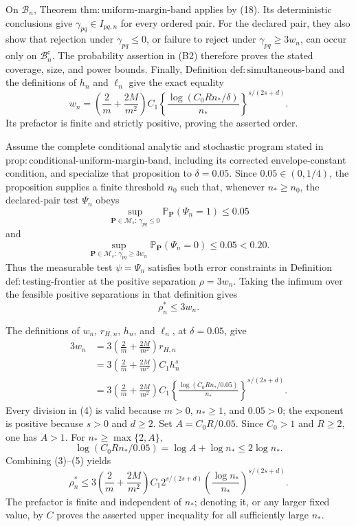 On \(\mathcal B_n\), Theorem \(\mathrm{thm:uniform\text{-}margin\text{-}band}\) applies by (18).  Its deterministic conclusions give \(\gamma_{pq}\in I_{pq,n}\) for every ordered pair.  For the declared pair, they also show that rejection under \(\gamma_{pq}\le0\), or failure to reject under \(\gamma_{pq}\ge3w_n\), can occur only on \(\mathcal B_n^{\mathsf c}\).  The probability assertion in (B2) therefore proves the stated coverage, size, and power bounds.  Finally, Definition \(\mathrm{def:simultaneous\text{-}band}\) and the definitions of \(h_n\) and \(\ell_n\) give the exact equality
\[
 w_n=\left(\frac2m+\frac{2M}{m^2}\right)C_1
 \left\{\frac{\log(C_0Rn_\ast/\delta)}{n_\ast}\right\}^{s/(2s+d)}.
\]
Its prefactor is finite and strictly positive, proving the asserted order.

Assume the complete conditional analytic and stochastic program stated in \(\mathrm{prop:conditional\text{-}uniform\text{-}margin\text{-}band}\), including its corrected envelope-constant condition, and specialize that proposition to \(\delta=0.05\).  Since \(0.05\in(0,1/4)\), the proposition supplies a finite threshold \(n_0\) such that, whenever \(n_\ast\ge n_0\), the declared-pair test \(\Psi_n\) obeys
\[
 \sup_{\mathbf P\in\mathcal M_s:\,\gamma_{pq}\le0}
 \mathbb P_{\mathbf P}(\Psi_n=1)\le0.05
 \tag{1}
\]
and
\[
 \sup_{\mathbf P\in\mathcal M_s:\,\gamma_{pq}\ge3w_n}
 \mathbb P_{\mathbf P}(\Psi_n=0)\le0.05<0.20.
 \tag{2}
\]
Thus the measurable test \(\psi=\Psi_n\) satisfies both error constraints in Definition \(\mathrm{def:testing\text{-}frontier}\) at the positive separation \(\rho=3w_n\).  Taking the infimum over the feasible positive separations in that definition gives
\[
 \rho_n^\ast\le3w_n.
 \tag{3}
\]

The definitions of \(w_n\), \(r_{H,n}\), \(h_n\), and \(\ell_n\), at \(\delta=0.05\), give
\[
\begin{aligned}
 3w_n
 &=3\left(\frac2m+\frac{2M}{m^2}\right)r_{H,n}\\
 &=3\left(\frac2m+\frac{2M}{m^2}\right)C_1h_n^s\\
 &=3\left(\frac2m+\frac{2M}{m^2}\right)C_1
 \left\{\frac{\log(C_0Rn_\ast/0.05)}{n_\ast}\right\}^{s/(2s+d)}.
\end{aligned}
 \tag{4}
\]
Every division in (4) is valid because \(m>0\), \(n_\ast\ge1\), and \(0.05>0\); the exponent is positive because \(s>0\) and \(d\ge2\).  Set \(A=C_0R/0.05\).  Since \(C_0>1\) and \(R\ge2\), one has \(A>1\).  For \(n_\ast\ge\max\{2,A\}\),
\[
 \log(C_0Rn_\ast/0.05)=\log A+\log n_\ast\le2\log n_\ast.
 \tag{5}
\]
Combining (3)--(5) yields
\[
 \rho_n^\ast
 \le
 3\left(\frac2m+\frac{2M}{m^2}\right)C_1
 2^{s/(2s+d)}
 \left(\frac{\log n_\ast}{n_\ast}\right)^{s/(2s+d)}.
 \tag{6}
\]
The prefactor is finite and independent of \(n_\ast\); denoting it, or any larger fixed value, by \(C\) proves the asserted upper inequality for all sufficiently large \(n_\ast\).

